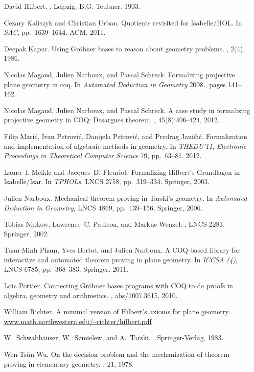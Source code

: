 \begin{thebibliography}{10}
David Hilbert.
.
\newblock Leipzig, B.G. Teubner, 1903.

Cezary Kaliszyk and Christian Urban.
\newblock Quotients revisited for Isabelle/HOL.
\newblock In {\em SAC}, pp.~1639--1644. ACM, 2011.

Deepak Kapur.
\newblock Using Gr\"obner bases to reason about geometry problems.
, 2(4), 1986.

Nicolas Magaud, Julien Narboux, and Pascal Schreck.
\newblock Formalizing projective plane geometry in coq.
\newblock In {\em Automated Deduction in Geometry} 2008., pages 141--162.

Nicolas Magaud, Julien Narboux, and Pascal Schreck.
\newblock A case study in formalizing projective geometry in COQ: Desargues
  theorem.
, 45(8):406--424, 2012.

Filip Mari\'c, Ivan Petrovi\'c, Danijela Petrovi\'c, and Predrag Jani\v{c}i\'c.
\newblock Formalization and implementation of algebraic methods in geometry.
\newblock In {\em THEDU'11}, {\em Electronic Proceedings in Theoretical Computer Science} 79, pp.~63--81. 2012.

Laura~I. Meikle and Jacques~D. Fleuriot.
\newblock Formalizing Hilbert's Grundlagen in Isabelle/Isar.
\newblock In {\em TPHOLs}, LNCS 2758, pp.~319--334. Springer, 2003.

Julien Narboux.
\newblock Mechanical theorem proving in Tarski's geometry.
\newblock In {\em Automated Deduction in Geometry}, LNCS 4869, pp.~139--156. Springer, 2006.

Tobias Nipkow, Lawrence~C. Paulson, and Markus Wenzel.
, LNCS 2283.
\newblock Springer, 2002.

Tuan-Minh Pham, Yves Bertot, and Julien Narboux.
\newblock A COQ-based library for interactive and automated theorem proving in
  plane geometry.
\newblock In {\em ICCSA (4)}, LNCS 6785, pp.~368--383. Springer, 2011.

Lo\"{\i}c Pottier.
\newblock Connecting Gr{\"o}bner bases programs with COQ to do proofs in
  algebra, geometry and arithmetics.
, abs/1007.3615, 2010.

William Richter.
\newblock A minimal version of Hilbert's axioms for plane geometry.
\newblock \url{www.math.northwestern.edu/~richter/hilbert.pdf}

W.~Schwabhäuser, W.~Szmielew, and A.~Tarski.
.
\newblock Springer-Verlag, 1983.

Wen-Ts\"un Wu.
\newblock On the decision problem and the mechanization of theorem proving in
  elementary geometry.
, 21, 1978.
\end{thebibliography}



